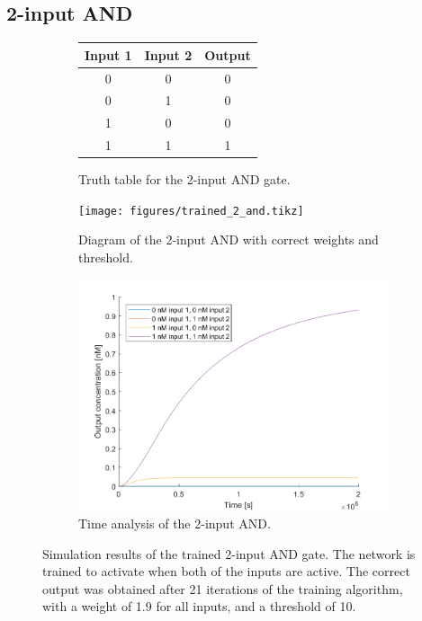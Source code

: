 \subsection{2-input AND}

\begin{figure}[H]
  \begin{subfigure}[t]{.49\columnwidth}

      \centering
    \begin{tabular}[b]{ccc}
      \hline
      \multicolumn{1}{l}{\textbf{Input 1}} & \multicolumn{1}{l}{\textbf{Input 2}} & \multicolumn{1}{l}{\textbf{Output}} \\
      \hline
      0                                    & 0                                    & 0                                   \\
      0                                    & 1                                    & 0                                   \\
      1                                    & 0                                    & 0                                   \\
      1                                    & 1                                    & 1 \\
      \hline
    \end{tabular}
    \caption{Truth table for the 2-input AND gate.}
  \end{subfigure}
  \begin{subfigure}[t]{.49\textwidth}
    \texttt{[image: figures/trained\_2\_and.tikz]}
    \caption{Diagram of the 2-input AND with correct weights and threshold.}
  \end{subfigure}
\hfill
\begin{subfigure}[t]{\textwidth}
  \centering
\includegraphics[width=\textwidth]{images/and_simulation.png}
\caption{Time analysis of the 2-input AND.}
\end{subfigure}
\caption{Simulation results of the trained 2-input AND gate. The network is trained to activate when both of the inputs are active. The correct output was obtained after 21 iterations of the training algorithm, with a weight of 1.9 for all inputs, and a threshold of 10.}
\label{2_and}
\end{figure}

